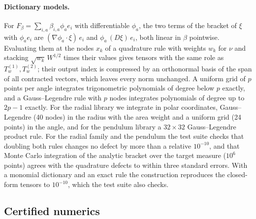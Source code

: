 \paragraph{Dictionary models.} For $F_\beta = \sum_{i,a}\beta_{i,a}\phi_a e_i$
with differentiable $\phi_a$, the two terms of the bracket of $\xi$ with
$\phi_a e_i$ are $(\nabla\phi_a\cdot\xi)\,e_i$ and $\phi_a\,(D\xi)\,e_i$, both
linear in $\beta$ pointwise. Evaluating them at the nodes $x_k$ of a quadrature
rule with weights $w_k$ for $\nu$ and stacking $\sqrt{w_k}\,W^{1/2}$ times
their values gives tensors with the same role as $T^{(1)}_w, T^{(2)}_w$; their
output index is compressed by an orthonormal basis of the span of all
contracted vectors, which leaves every norm unchanged. A uniform grid of $p$
points per angle integrates trigonometric polynomials of degree below $p$
exactly, and a Gauss--Legendre rule with $p$ nodes integrates polynomials of
degree up to $2p-1$ exactly. For the radial library we integrate in polar
coordinates, Gauss--Legendre (40 nodes) in the radius with the area weight and
a uniform grid (24 points) in the angle, and for the pendulum library a
$32 \times 32$ Gauss--Legendre product rule. For the radial family and the
pendulum the test suite checks that doubling both rules changes no defect by
more than a relative $10^{-10}$, and that Monte Carlo integration of the
analytic bracket over the target measure ($10^{6}$ points) agrees with the
quadrature defects to within three standard errors. With a monomial dictionary and an exact rule the construction
reproduces the closed-form tensors to $10^{-10}$, which the test suite also
checks.

\subsection{Certified numerics}
\label{sec:numerics}

